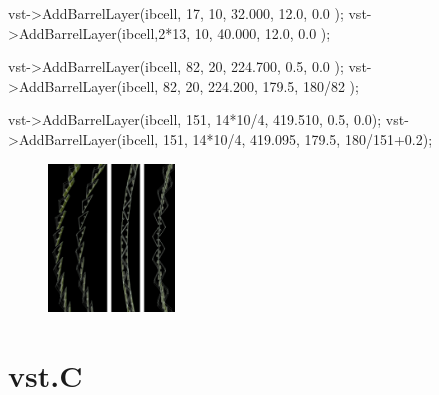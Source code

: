 \documentclass[12pt]{article}
\begin{document}
\begin{tcolorbox}
\begin{verbnobox}[\scriptsize]
vst->AddBarrelLayer(ibcell,  17,      10,  32.000,  12.0, 0.0        );
vst->AddBarrelLayer(ibcell,2*13,      10,  40.000,  12.0, 0.0        );

vst->AddBarrelLayer(ibcell,  82,      20, 224.700,   0.5, 0.0        );
vst->AddBarrelLayer(ibcell,  82,      20, 224.200, 179.5, 180/82     );

vst->AddBarrelLayer(ibcell, 151, 14*10/4, 419.510,   0.5,         0.0);
vst->AddBarrelLayer(ibcell, 151, 14*10/4, 419.095, 179.5, 180/151+0.2);
\end{verbnobox}  
\end{tcolorbox}

\begin{figure}
\centering
\includegraphics[width=0.3\textwidth]{figures/barrel_upgrades.jpg}
\caption{}
\label{fig:barrel_upgrades}
\end{figure}


\pagebreak
\section{vst.C}
\end{document}
